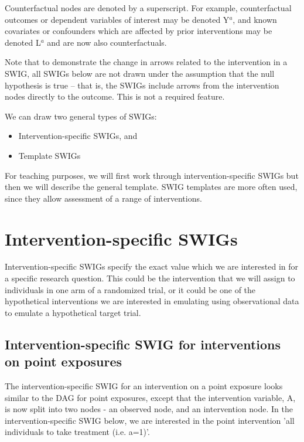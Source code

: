 \documentclass[a4paper]{report}
\begin{document}
Counterfactual nodes are denoted by a superscript. For example, counterfactual outcomes or dependent variables of interest may be denoted Y$^a$, and known covariates or confounders which are affected by prior interventions may be denoted L$^a$ and are now also counterfactuals. 

Note that to demonstrate the change in arrows related to the intervention in a SWIG, all SWIGs below are not drawn under the assumption that the null hypothesis is true -- that is, the SWIGs include arrows from the intervention nodes directly to the outcome. This is not a required feature. 

We can draw two general types of SWIGs: 
\begin{itemize}
\item Intervention-specific SWIGs, and 
\item Template SWIGs 

\end{itemize}

For teaching purposes, we will first work through intervention-specific SWIGs but then we will describe the general template. SWIG templates are more often used, since they allow assessment of a range of interventions.

\newpage

\section{Intervention-specific SWIGs}

Intervention-specific SWIGs specify the exact value which we are interested in for a specific research question. This could be the intervention that we will assign to individuals in one arm of a randomized trial, or it could be one of the hypothetical interventions we are interested in emulating using observational data to emulate a hypothetical target trial.

\subsection{Intervention-specific SWIG for interventions on point exposures}

The intervention-specific SWIG for an intervention on a point exposure looks similar to the DAG for point exposures, except that the intervention variable, A, is now split into two nodes - an observed node, and an intervention node. In the intervention-specific SWIG below, we are interested in the point intervention 'all individuals to take treatment (i.e. a=1)'. 
\end{document}
